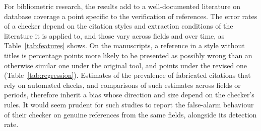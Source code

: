 \documentclass[pdflatex,sn-apa]{sn-jnl}
\begin{document}
For bibliometric research, the results add to a well-documented literature on database coverage \citep{martinmartin2018, visser2021, verabaceta2019} a point specific to the verification of references. The error rates of a checker depend on the citation styles and extraction conditions of the literature it is applied to, and those vary across fields and over time, as Table~\ref{tab:features} shows. On the manuscripts, a reference in a style without titles is \RegBaseNoTitle{} percentage points more likely to be presented as possibly wrong than an otherwise similar one under the original tool, and \RegRevNoTitle{} points under the revised one (Table~\ref{tab:regression}). Estimates of the prevalence of fabricated citations that rely on automated checks, and comparisons of such estimates across fields or periods, therefore inherit a bias whose direction and size depend on the checker's rules. It would seem prudent for such studies to report the false-alarm behaviour of their checker on genuine references from the same fields, alongside its detection rate.
\end{document}
